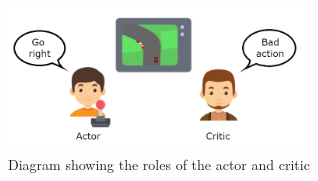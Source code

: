 \begin{figure}[H]
  \centering
  \includegraphics[width=0.7\textwidth]{figures/images/actor_critic.png}
  \caption[Actor and critic roles]{Diagram showing the roles of the actor and critic}
  \label{fig:actor_critic}
\end{figure}
